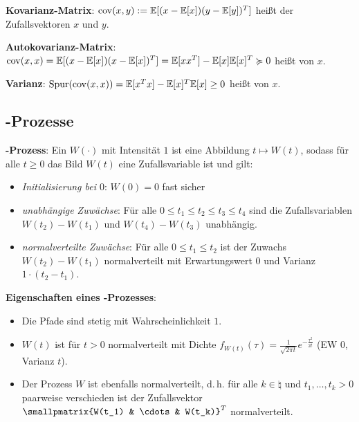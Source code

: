 \textbf{Kovarianz-Matrix}:
$\operatorname{cov}(x, y) := \mathbb{E}[(x - \mathbb{E}[x]) (y - \mathbb{E}[y])^T]$ heißt
 der Zufallsvektoren $x$ und $y$.

\textbf{Autokovarianz-Matrix}:
$\operatorname{cov}(x, x) = \mathbb{E}[(x - \mathbb{E}[x]) (x - \mathbb{E}[x])^T] = \mathbb{E}[xx^T] - \mathbb{E}[x]\mathbb{E}[x]^T \succcurlyeq 0$
heißt  von $x$.

\textbf{Varianz}:
$\operatorname{Spur}(\operatorname{cov}(x, x)) = \mathbb{E}[x^T x] - \mathbb{E}[x]^T \mathbb{E}[x] \ge 0$
heißt  von $x$.

\subsection{%
    -Prozesse%
}

\textbf{-Prozess}:
Ein 
$W(\cdot)$ mit Intensität $1$ ist eine Abbildung $t \mapsto W(t)$,
sodass für alle $t \ge 0$ das Bild $W(t)$ eine Zufallsvariable ist und gilt:
\begin{itemize}
    \item
    \emph{Initialisierung bei $0$}:
    $W(0) = 0$ fast sicher
    
    \item
    \emph{unabhängige Zuwächse}:
    Für alle $0 \le t_1 \le t_2 \le t_3 \le t_4$ sind die Zufallsvariablen\\
    $W(t_2) - W(t_1)$ und $W(t_4) - W(t_3)$ unabhängig.
    
    \item
    \emph{normalverteilte Zuwächse}:
    Für alle $0 \le t_1 \le t_2$ ist der Zuwachs $W(t_2) - W(t_1)$ normalverteilt
    mit Erwartungswert $0$ und Varianz $1 \cdot (t_2 - t_1)$.
\end{itemize}

\textbf{Eigenschaften eines -Prozesses}:
\begin{itemize}
    \item
    Die Pfade sind stetig mit Wahrscheinlichkeit $1$.
    
    \item
    $W(t)$ ist für $t > 0$ normalverteilt mit Dichte
    $f_{W(t)}(\tau) = \frac{1}{\sqrt{2\pi t}} e^{-\frac{\tau^2}{2t}}$
    (EW $0$, Varianz $t$).
    
    \item
    Der Prozess $W$ ist ebenfalls normalverteilt, d.\,h.
    für alle $k \in \natural$ und $t_1, \dotsc, t_k > 0$ paarweise verschieden ist
    der Zufallsvektor $\smallpmatrix{W(t_1) & \cdots & W(t_k)}^T$ normalverteilt.
\end{itemize}

